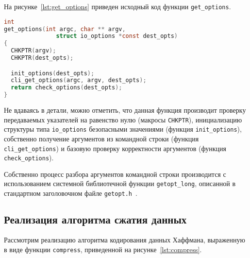 На рисунке~\ref{lst:get_options} приведен исходный код функции \texttt{get\_options}.

\begin{lstlisting}[basicstyle=\scriptsize\ttfamily,
                   numberstyle=\scriptsize\ttfamily,
                   xleftmargin=7mm,
                   language=C,caption=Функция get\_options,
                   label=lst:get_options]
int
get_options(int argc, char ** argv,
               struct io_options *const dest_opts)
{
  CHKPTR(argv);
  CHKPTR(dest_opts);

  init_options(dest_opts);
  cli_get_options(argc, argv, dest_opts);
  return check_options(dest_opts);
}
\end{lstlisting}

Не вдаваясь в детали, можно отметить, что данная функция производит проверку
передаваемых указателей на равенство нулю (макросы \texttt{CHKPTR}),
инициализацию структуры типа \texttt{io\_options} безопасными значениями
(функция \texttt{init\_options}),
собственно получение аргументов из командной строки
(функция \texttt{cli\_get\_options}) и
базовую проверку корректности аргументов
(функция \texttt{check\_options}).

Собственно процесс разбора аргументов командной строки производится
с использованием системной библиотечной функции \texttt{getopt\_long}, 
описанной в стандартном заголовочном файле 
\texttt{getopt.h}~\cite{man_getopt_long}.

\subsection{Реализация алгоритма сжатия данных}

Рассмотрим реализацию алгоритма кодирования данных Хаффмана,
выраженную в виде функции \texttt{compress},
приведенной на рисунке~\ref{lst:compress}.

